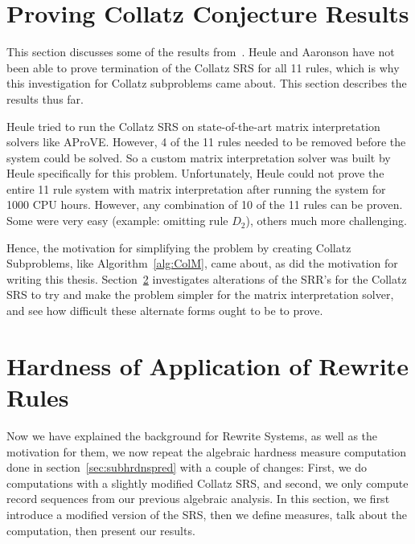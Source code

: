 \documentclass[12pt]{article}
\theoremstyle{definition}
\begin{document}
\section{Proving Collatz Conjecture Results} \label{sec:provingCollatzresults}
This section discusses some of the results from~\cite{HeuleAaronson}. Heule and Aaronson have not been able to prove termination of the Collatz SRS for all 11 rules, which is why this investigation for Collatz subproblems came about. This section describes the results thus far. \par
Heule tried to run the Collatz SRS on state-of-the-art matrix interpretation solvers like AProVE. However, 4 of the 11 rules needed to be removed before the system could be solved. So a custom matrix interpretation solver was built by Heule specifically for this problem. 
Unfortunately, Heule could not prove the entire 11 rule system with matrix interpretation after running the system for 1000 CPU hours. However, any combination of 10 of the 11 rules can be proven. Some were very easy (example: omitting rule $D_2$), others much more challenging.\par
Hence, the motivation for simplifying the problem by creating Collatz Subproblems, like Algorithm~\ref{alg:ColM}, came about, as did the motivation for writing this thesis. Section~\ref{sec:hardnessrewriterules} investigates alterations of the SRR's for the Collatz SRS to try and make the problem simpler for the matrix interpretation solver, and see how difficult these alternate forms ought to be to prove.

\section{Hardness of Application of Rewrite Rules} \label{sec:hardnessrewriterules}
Now we have explained the background for Rewrite Systems, as well as the motivation for them, we now repeat the algebraic hardness measure computation done in section~\ref{sec:subhrdnspred} with a couple of changes: First, we do computations with a slightly modified Collatz SRS, and second, we only compute record sequences from our previous algebraic analysis. In this section, we first introduce a modified version of the SRS, then we define measures, talk about the computation, then present our results.
\end{document}
